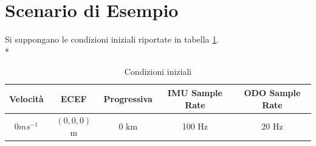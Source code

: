 \section{Scenario di Esempio}
Si suppongano le condizioni iniziali riportate in tabella \ref{tab:condinit}.\\*
\begin{table}[h]
	\centering
	\begin{tabular}{|c|c|c|c|c|}
		\hline 
		\textbf{Velocit\`a} & \textbf{ECEF} & \textbf{Progressiva} & \textbf{IMU Sample Rate} & \textbf{ODO Sample Rate} \\ 
		\hline 
		$0ms^{-1}$ & $(0, 0, 0)$ m & 0 km & 100 Hz & 20 Hz \\ 
		\hline 
	\end{tabular} 
	\caption{Condizioni iniziali}
	\label{tab:condinit}
\end{table}
